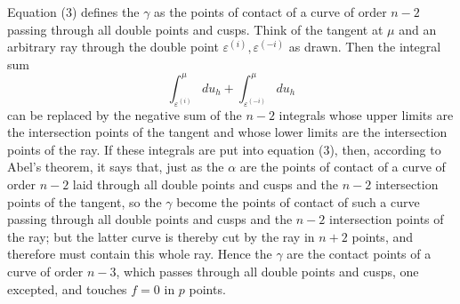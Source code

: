 \documentclass[10pt]{article}
\begin{document}
Equation (3) defines the \(\gamma\) as the points of contact of a curve of order \(n-2\) passing through all double points and cusps. Think of the tangent at \(\mu\) and an arbitrary ray through the double point \(\varepsilon^{(i)},\varepsilon^{(-i)}\) as drawn. Then the integral sum
\[
\int_{\varepsilon^{(i)}}^{\mu}du_h+
\int_{\varepsilon^{(-i)}}^{\mu}du_h
\]
can be replaced by the negative sum of the \(n-2\) integrals whose upper limits are the intersection points of the tangent and whose lower limits are the intersection points of the ray. If these integrals are put into equation (3), then, according to Abel's theorem, it says that, just as the \(\alpha\) are the points of contact of a curve of order \(n-2\) laid through all double points and cusps and the \(n-2\) intersection points of the tangent, so the \(\gamma\) become the points of contact of such a curve passing through all double points and cusps and the \(n-2\) intersection points of the ray; but the latter curve is thereby cut by the ray in \(n+2\) points, and therefore must contain this whole ray. Hence the \(\gamma\) are the contact points of a curve of order \(n-3\), which passes through all double points and cusps, one excepted, and touches \(f=0\) in \(p\) points.
\end{document}
